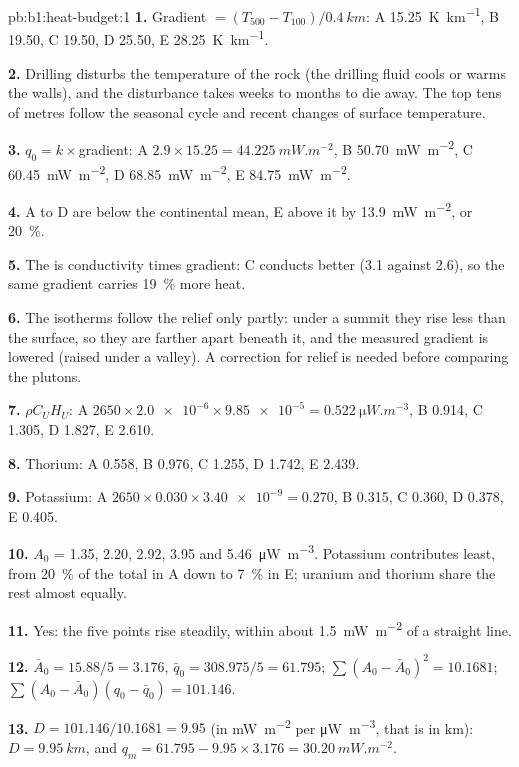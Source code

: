 \begin{solution}{pb:b1:heat-budget:1}
\textbf{1.} Gradient $= (T_{500} - T_{100})/\qty{0.4}{km}$: A \qty{15.25}{K.km^{-1}},
B \num{19.50}, C \num{19.50}, D \num{25.50}, E \qty{28.25}{K.km^{-1}}.

\textbf{2.} Drilling disturbs the temperature of the rock (the drilling fluid
cools or warms the walls), and the disturbance takes weeks to months to die away.
The top tens of metres follow the seasonal cycle and recent changes of surface
temperature.

\textbf{3.} $q_0 = k\times$gradient: A $2.9\times15.25 = \qty{44.225}{mW.m^{-2}}$,
B \qty{50.70}{mW.m^{-2}}, C \qty{60.45}{mW.m^{-2}}, D \qty{68.85}{mW.m^{-2}},
E \qty{84.75}{mW.m^{-2}}.

\textbf{4.} A to D are below the continental mean, E above it by
\qty{13.9}{mW.m^{-2}}, or \qty{20}{\percent}.

\textbf{5.} The  is conductivity times gradient: C conducts better (3.1
against 2.6), so the same gradient carries \qty{19}{\percent} more heat.

\textbf{6.} The isotherms follow the relief only partly: under a summit they
rise less than the surface, so they are farther apart beneath it, and the
measured gradient is lowered (raised under a valley). A correction for relief is
needed before comparing the plutons.

\textbf{7.} $\rho C_U H_U$: A $2650\times\num{2.0e-6}\times\num{9.85e-5} =
\qty{0.522}{\micro W.m^{-3}}$, B 0.914, C 1.305, D 1.827, E 2.610.

\textbf{8.} Thorium: A 0.558, B 0.976, C 1.255, D 1.742, E 2.439.

\textbf{9.} Potassium: A $2650\times0.030\times\num{3.40e-9} = 0.270$, B 0.315,
C 0.360, D 0.378, E 0.405.

\textbf{10.} $A_0$ = 1.35, 2.20, 2.92, 3.95 and \qty{5.46}{\micro W.m^{-3}}.
Potassium contributes least, from \qty{20}{\percent} of the total in A down to
\qty{7}{\percent} in E; uranium and thorium share the rest almost equally.

\textbf{11.} Yes: the five points rise steadily, within about
\qty{1.5}{mW.m^{-2}} of a straight line.

\textbf{12.} $\bar A_0 = 15.88/5 = 3.176$, $\bar q_0 = 308.975/5 = 61.795$;
$\sum(A_0 - \bar A_0)^2 = 10.1681$; $\sum(A_0 - \bar A_0)(q_0 - \bar q_0) =
101.146$.

\textbf{13.} $D = 101.146/10.1681 = 9.95$ (in \unit{mW.m^{-2}} per
\unit{\micro W.m^{-3}}, that is in km): $D = \qty{9.95}{km}$, and $q_m = 61.795 -
9.95\times3.176 = \qty{30.20}{mW.m^{-2}}$.


\end{solution}
